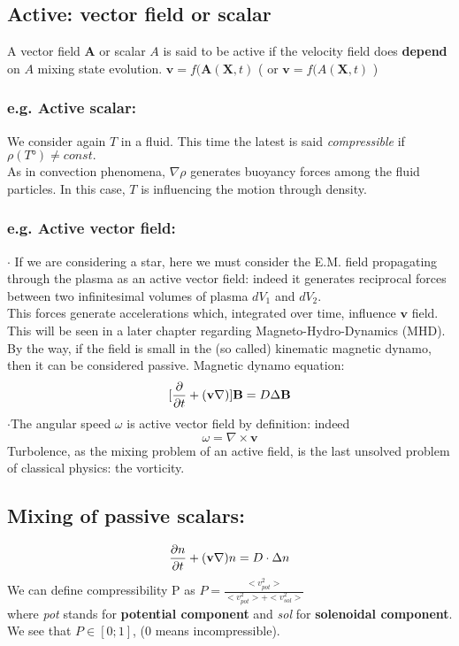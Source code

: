 \documentclass[a4paper,11pt]{article}
\begin{document}
 \subsection{Active: vector field or scalar}
 A vector field $\mathbf{A}$ or scalar $A$ is said to be active if the velocity field does \textbf{depend} on $A$ mixing state evolution.
  $ \mathbf{v} = f(\mathbf{A}(\mathbf{X},t) $  ( or $ \mathbf{v} = f(A(\mathbf{X},t) $ )
	\subsubsection{e.g. Active scalar:}
We consider again $T$ in a fluid. This time the latest is said \emph{compressible} if 
$ \rho(T°) \neq const. $\\
As in convection phenomena, $\nabla\rho$ generates buoyancy forces among the fluid particles. In this case, $T$ is influencing the motion through density.
	\subsubsection{e.g. Active vector field:} %
$\cdot$ If we are considering a star, here we must consider the E.M. field propagating through the plasma as an active vector field: 
indeed it generates reciprocal forces between two infinitesimal volumes of plasma $dV_1$ and $dV_2$. \\
This forces generate accelerations which, integrated over time, influence $\mathbf{v}$ field.
This will be seen in a later chapter regarding Magneto-Hydro-Dynamics (MHD).
By the way, if the field is small in the (so called) kinematic magnetic dynamo, then it can be considered passive. 
Magnetic dynamo equation: \[ [\pdv{}{t}+(\mathbf{v}\nabla)] \mathbf{B}=D \Delta \mathbf{B} \]
$\cdot$The angular speed $\omega$ is active vector field by definition: indeed
\[  \omega=\nabla \times \mathbf{v} \]
Turbolence, as the mixing problem of an active field, is the last unsolved problem of classical physics: the vorticity.

\subsection{Mixing of passive scalars:}
\[ \pdv{n}{t}+(\mathbf{v} \nabla)n = D \cdot \Delta n \]
We can define compressibility P as $P=\frac{<v_{pot}^2>}{<v_{pot}^2>+<v_{sol}^2>}$\\
where \emph{pot} stands for \textbf{potential component} and \emph{sol} for \textbf{solenoidal component}. We see that $P \in [0;1]$, (0 means incompressible).
\end{document}
